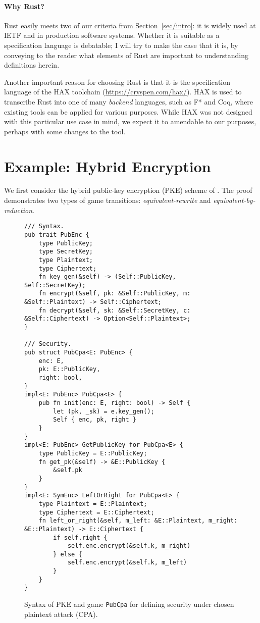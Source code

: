\documentclass{article}
\begin{document}
\paragraph{Why Rust?}
%
Rust easily meets two of our criteria from Section~\ref{sec/intro}: it is
widely used at IETF and in production software systems.
%
Whether it is suitable as a specification language is debatable; I will try to
make the case that it is, by conveying to the reader what elements of Rust are
important to understanding definitions herein.

Another important reason for choosing Rust is that it is the specification
language of the HAX toolchain (\url{https://cryspen.com/hax/}).
%
HAX is used to transcribe Rust into one of many \emph{backend} languages, such
as F* and Coq, where existing tools can be applied for various purposes.
%
While HAX was not designed with this particular use case in mind, we expect it
to amendable to our purposes, perhaps with some changes to the tool.


\section{Example: Hybrid Encryption}\label{sec/hybrid}

We first consider the hybrid public-key encryption (PKE) scheme of
\cite[Chapter~15]{joy}.
%
The proof demonstrates two types of game transitions: \emph{equivalent-rewrite}
and \emph{equivalent-by-reduction}.


\begin{figure}[t]
\begin{lstlisting}
/// Syntax.
pub trait PubEnc {
    type PublicKey;
    type SecretKey;
    type Plaintext;
    type Ciphertext;
    fn key_gen(&self) -> (Self::PublicKey, Self::SecretKey);
    fn encrypt(&self, pk: &Self::PublicKey, m: &Self::Plaintext) -> Self::Ciphertext;
    fn decrypt(&self, sk: &Self::SecretKey, c: &Self::Ciphertext) -> Option<Self::Plaintext>;
}

/// Security.
pub struct PubCpa<E: PubEnc> {
    enc: E,
    pk: E::PublicKey,
    right: bool,
}
impl<E: PubEnc> PubCpa<E> {
    pub fn init(enc: E, right: bool) -> Self {
        let (pk, _sk) = e.key_gen();
        Self { enc, pk, right }
    }
}
impl<E: PubEnc> GetPublicKey for PubCpa<E> {
    type PublicKey = E::PublicKey;
    fn get_pk(&self) -> &E::PublicKey {
        &self.pk
    }
}
impl<E: SymEnc> LeftOrRight for PubCpa<E> {
    type Plaintext = E::Plaintext;
    type Ciphertext = E::Ciphertext;
    fn left_or_right(&self, m_left: &E::Plaintext, m_right: &E::Plaintext) -> E::Ciphertext {
        if self.right {
            self.enc.encrypt(&self.k, m_right)
        } else {
            self.enc.encrypt(&self.k, m_left)
        }
    }
}
\end{lstlisting}
  \caption{Syntax of PKE and game \lstinline{PubCpa}
  for defining security under chosen plaintext attack (CPA).}
  \label{fig/pubenc/security}
  \label{fig/pubenc/syntax}
\end{figure}
\end{document}
